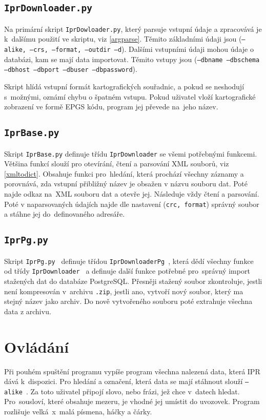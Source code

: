 \subsection{{\tt IprDownloader.py}}
Na primární skript {\tt IprDowloader.py}, který parsuje vstupní údaje a
zpracovává je k~dalšímu použití ve skriptu, viz \ref{argparse}. Těmito
základními údaji jsou
({\tt ---alike, ---crs, ---format, ---outdir ---d}).
Dalšími vstupními údaji mohou údaje o databázi, kam se mají data
importovat. Těmito vstupy jsou
({\tt ---dbname ---dbschema ---dbhost ---dbport ---dbuser ---dbpassword}).

Skript hlídá vstupní formát kartografických souřadnic, a pokud se
neshodují s~možnými, oznámí chybu o špatném vstupu. Pokud uživatel
vloží kartografické zobrazení ve formě EPGS kódu, program jej převede
na~jeho název.


\subsection{{\tt IprBase.py}}
Skript {\tt IprBase.py} definuje třídu {\tt IprDownloader} se všemi
potřebnými funkcemi. Většina funkcí slouží pro otevírání, čtení a
parsování XML souborů, viz \ref{xmltodict}. Obsahuje funkci
pro~hledání, která prochází všechny záznamy a porovnává, zda vstupní
přibližný název je obsažen v názvu souboru dat. Poté najde odkaz
na~XML souboru dat a otevře jej. Následuje vždy čtení a parsování.
Poté v naparsovaných údajích najde dle nastavení ({\tt crc, format})
správný soubor a stáhne jej do~definovaného adresáře.


\subsection{{\tt IprPg.py}}
Skript {\tt IprPg.py } definuje třídou {\tt IprDownloaderPg }, která
dědí všechny funkce od třídy {\tt IprDownloader } a definuje další
funkce potřebné pro~správný import stažených dat do databáze
PostgreSQL. Přesněji stažený soubor zkontroluje, jestli není 
kompresován v~archivu {\tt *.zip}, jestli ano, vytvoří nový soubor,
který ma stejný název jako archiv. Do nově vytvořeného souboru poté 
extrahuje všechna data z archivu.


\section{Ovládání}
Při pouhém spuštění programu vypíše program všechna nalezená data,
která IPR dává k~dispozici. Pro hledání a označení, která data se mají
stáhnout slouží {\tt ---alike }. Za toto uživatel připojí slovo, nebo
frázi, jež chce v~datech hledat. Pro~sousloví, které obsahuje mezeru,
je vhodné jej umístit do uvozovek. Program rozlišuje velká~x~malá
písmena, háčky a čárky.


